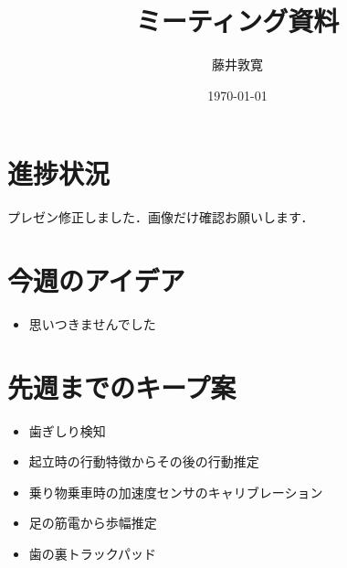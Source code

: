 \documentclass[a4j,twocolumn,10pt]{jarticle}
\title{ミーティング資料}
\author{藤井敦寛}
\date{\today}
\begin{document}
\maketitle

\section{進捗状況}
プレゼン修正しました．画像だけ確認お願いします．

\section{今週のアイデア}
\begin{itemize}
  \item 思いつきませんでした
\end{itemize}

\section{先週までのキープ案}
\begin{itemize}
  \item 歯ぎしり検知
  \item 起立時の行動特徴からその後の行動推定
  \item 乗り物乗車時の加速度センサのキャリブレーション
  \item 足の筋電から歩幅推定
  \item 歯の裏トラックパッド
\end{itemize}
\end{document}
